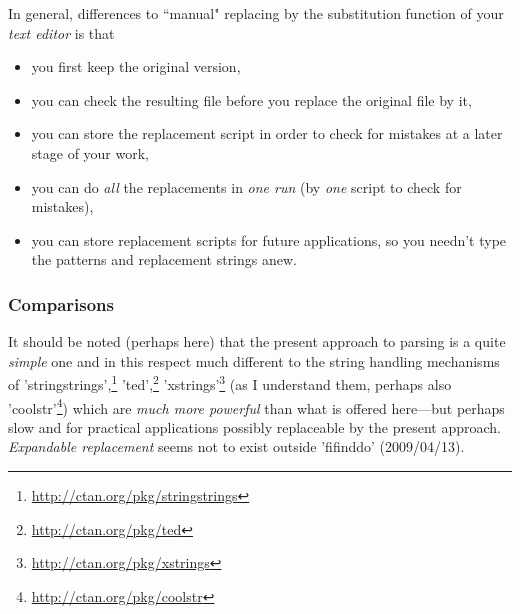 \documentclass[fleqn]{article}
\begin{document}
In general, differences to ``manual" replacing by the substitution 
function of your \emph{text editor} is that 
\begin{itemize}
\item you first keep the original version, 
\item you can check the resulting file before you replace the original 
      file by it, 
\item you can store the replacement script in order to check for 
      mistakes at a later stage of your work, 
\item you can do \emph{all} the replacements in \emph{one run} 
      (by \emph{one} script to check for mistakes), 
\item you can store replacement scripts for future applications, 
      so you needn't type the patterns and replacement strings anew. 
\end{itemize}


\subsubsection{Comparisons} %
% 
% 
% 
% 
It should be noted (perhaps here) that the present approach to parsing 
is a quite \emph{simple} one and in this respect much different to the 
string handling mechanisms of 
'stringstrings',\footnote{\url{http://ctan.org/pkg/stringstrings}} 
'ted',\footnote{\url{http://ctan.org/pkg/ted}} 
'xstrings'\footnote{\url{http://ctan.org/pkg/xstrings}} 
(as I understand them, perhaps also 
'coolstr'\footnote{\url{http://ctan.org/pkg/coolstr}}) 
which are \emph{much more powerful} than what is offered here---but 
perhaps slow and for practical applications possibly replaceable by 
the present approach.
\emph{Expandable replacement} seems not to exist outside 'fifinddo' 
(2009/04/13).
\end{document}
